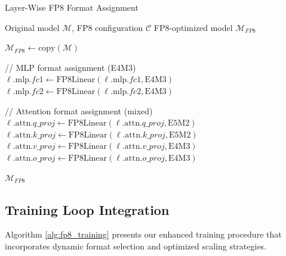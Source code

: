 \documentclass[conference]{IEEEtran}
\begin{document}
\begin{algorithm}[hbt!]
\caption{Layer-Wise FP8 Format Assignment}
\label{alg:layer_replacement}
\begin{algorithmic}
\Require Original model $\mathcal{M}$, FP8 configuration $\mathcal{C}$
\Ensure FP8-optimized model $\mathcal{M}_{FP8}$

\State $\mathcal{M}_{FP8} \gets \text{copy}(\mathcal{M})$

    \State // MLP format assignment (E4M3)
    \State $\ell.\text{mlp}.fc1 \gets \text{FP8Linear}(\ell.\text{mlp}.fc1, \text{E4M3})$
    \State $\ell.\text{mlp}.fc2 \gets \text{FP8Linear}(\ell.\text{mlp}.fc2, \text{E4M3})$
    
    \State // Attention format assignment (mixed)
    \State $\ell.\text{attn}.q\_proj \gets \text{FP8Linear}(\ell.\text{attn}.q\_proj, \text{E5M2})$
    \State $\ell.\text{attn}.k\_proj \gets \text{FP8Linear}(\ell.\text{attn}.k\_proj, \text{E5M2})$
    \State $\ell.\text{attn}.v\_proj \gets \text{FP8Linear}(\ell.\text{attn}.v\_proj, \text{E4M3})$
    \State $\ell.\text{attn}.o\_proj \gets \text{FP8Linear}(\ell.\text{attn}.o\_proj, \text{E4M3})$
\EndFor

\State \Return $\mathcal{M}_{FP8}$
\end{algorithmic}
\end{algorithm}

\subsection{Training Loop Integration}

Algorithm \ref{alg:fp8_training} presents our enhanced training procedure that incorporates dynamic format selection and optimized scaling strategies.
\end{document}
